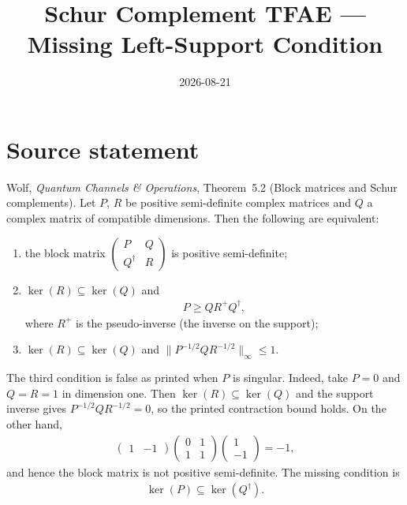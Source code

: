 \documentclass{article}
\title{Schur Complement TFAE --- Missing Left-Support Condition}
\author{}
\date{2026-08-21}
\begin{document}
\maketitle

\section{Source statement}
Wolf, \textit{Quantum Channels \& Operations}, Theorem~5.2 (Block matrices and
Schur complements). Let $P$, $R$ be positive semi-definite complex matrices
and $Q$ a complex matrix of compatible dimensions. Then the following are
equivalent:
\begin{enumerate}
  \item the block matrix
    $\begin{pmatrix} P & Q \\ Q^\dagger & R \end{pmatrix}$
    is positive semi-definite;
  \item $\ker(R) \subseteq \ker(Q)$ and
    \begin{align}
      P \ge Q R^{+} Q^\dagger,
      \tag{Wolf, Theorem 5.2 (2)}
    \end{align}
    where $R^{+}$ is the pseudo-inverse (the inverse on the support);
  \item $\ker(R) \subseteq \ker(Q)$ and
    $\|P^{-1/2} Q R^{-1/2}\|_\infty \le 1$.
\end{enumerate}

The third condition is false as printed when $P$ is singular. Indeed, take
$P=0$ and $Q=R=1$ in dimension one. Then
$\ker(R)\subseteq\ker(Q)$ and the support inverse gives
$P^{-1/2}QR^{-1/2}=0$, so the printed contraction bound holds. On the other
hand,
\begin{align}
  \begin{pmatrix}1&-1\end{pmatrix}
  \begin{pmatrix}0&1\\1&1\end{pmatrix}
  \begin{pmatrix}1\\-1\end{pmatrix}=-1,
\end{align}
and hence the block matrix is not positive semi-definite. The missing
condition is
\begin{align}
  \ker(P)\subseteq\ker(Q^\dagger).
  \tag{left-support condition}
\end{align}
\end{document}
